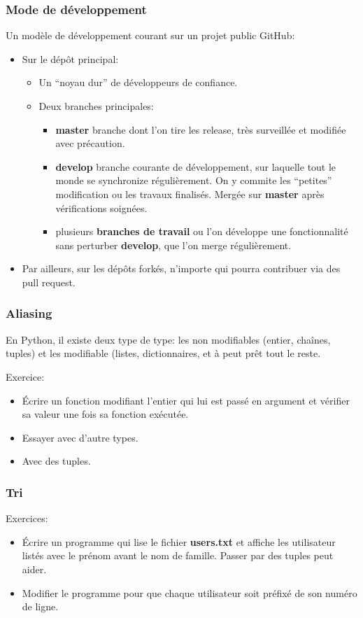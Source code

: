 \documentclass{beamer}
\begin{document}
\begin{frame}\frametitle{Mode de développement}
  Un modèle de développement courant sur un projet public GitHub:
  \begin{itemize}
  \item Sur le dépôt principal:
    \begin{itemize}
    \item Un ``noyau dur'' de développeurs de confiance.
    \item Deux branches principales:
      \begin{itemize}
      \item {\bf master} branche dont l'on tire les release, très surveillée et modifiée avec précaution.
      \item {\bf develop} branche courante de développement, sur laquelle tout le monde se synchronize régulièrement. On y commite les ``petites'' modification ou les travaux finalisés. 
        Mergée sur {\bf master} après vérifications soignées.
      \item plusieurs {\bf branches de travail} ou l'on développe une fonctionnalité sans perturber {\bf develop}, que l'on merge régulièrement.
      \end{itemize}
    \end{itemize}
  \item Par ailleurs, sur les dépôts forkés, n'importe qui pourra contribuer via des pull request.
  \end{itemize}
\end{frame}

\begin{frame}\frametitle{Aliasing}
  En Python, il existe deux type de type: les non modifiables (entier, chaînes, tuples) et les modifiable (listes, dictionnaires, et à peut prêt tout le reste.
  
  Exercice: 
  \begin{itemize}
  \item Écrire un fonction modifiant l'entier qui lui est passé en argument et vérifier sa valeur une fois sa fonction exécutée.
  \item Essayer avec d'autre types.
  \item Avec des tuples.
  \end{itemize}
\end{frame}

\begin{frame}\frametitle{Tri}
  Exercices:
  \begin{itemize}
  \item Écrire un programme qui lise le fichier {\bf users.txt} et affiche les utilisateur listés avec le prénom avant le nom de famille. Passer par des tuples peut aider.
  \item Modifier le programme pour que chaque utilisateur soit préfixé de son numéro de ligne.
  \end{itemize}
\end{frame}
\end{document}
